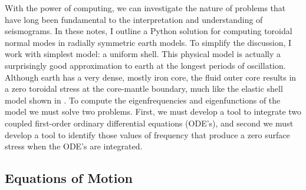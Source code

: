 \documentclass[11pt,titlepage,fleqn]{article}
\begin{document}
With the power of computing, we can investigate the nature of problems that have long been fundamental to the interpretation and understanding of seismograms. In these notes, I outline a Python solution for computing toroidal normal modes in radially symmetric earth models. To simplify the discussion, I work with simplest model: a uniform shell. This physical model is actually a surprisingly good approximation to earth at the longest periods of oscillation. Although earth has a very dense, mostly iron core, the fluid outer core results in a zero toroidal stress at the core-mantle boundary, much like the elastic shell model shown in . To compute the eigenfrequencies and eigenfunctions of the model we must solve two problems. First, we must develop a tool to integrate two coupled first-order ordinary differential equations (ODE's), and second we must develop a tool to identify those values of frequency that produce a zero surface stress when the ODE's are integrated.

\subsection{Equations of Motion}
\end{document}

